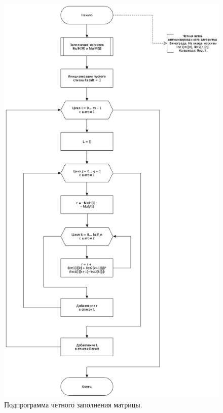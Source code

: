 \documentclass[12pt]{report}
\begin{document}
\begin{figure}[H]
	\centering
	\includegraphics[width=0.8\linewidth]{even}
	\caption{Подпрограмма четного заполнения матрицы.}
	\label{ris:image9}
\end{figure}

\newpage
\end{document}
